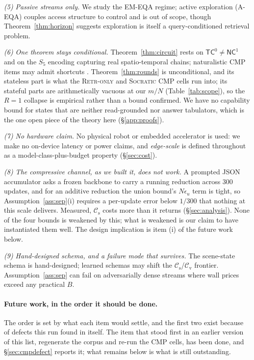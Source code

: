 \documentclass[10pt]{article}
\newcommand{\VN}{300}
\theoremstyle{definition}
\theoremstyle{plain}
\newcommand{\cs}{\mathcal{C}_{\mathrm{s}}}
\newcommand{\cv}{\mathcal{C}_{\mathrm{v}}}
\begin{document}
\emph{(5) Passive streams only.} We study the EM-EQA regime; active exploration (A-EQA) couples access structure to control and is out of scope, though Theorem~\ref{thm:horizon} suggests exploration is itself a query-conditioned retrieval problem.

\emph{(6) One theorem stays conditional.} Theorem~\ref{thm:circuit} rests on $\mathsf{TC}^0\neq\mathsf{NC}^1$ and on the $S_5$ encoding capturing real spatio-temporal chains; naturalistic CMP items may admit shortcuts \citep{shortcuts}. Theorem~\ref{thm:rounds} is unconditional, and its stateless part is what the \textsc{Retr-only} and \textsc{Socratic} CMP cells run into; its stateful parts are arithmetically vacuous at our $m/N$ (Table~\ref{tab:scope}), so the $R{=}1$ collapse is empirical rather than a bound confirmed. We have no capability bound for states that are neither read-grounded nor answer tabulators, which is the one open piece of the theory here (\S\ref{app:proofs}).

\emph{(7) No hardware claim.} No physical robot or embedded accelerator is used: we make no on-device latency or power claims, and \emph{edge-scale} is defined throughout as a model-class-plus-budget property (\S\ref{sec:cost}).

\emph{(8) The compressive channel, as we built it, does not work.} A prompted JSON accumulator
asks a frozen backbone to carry a running reduction across $\VN{}$ updates, and for an additive
reduction the union bound's $N\epsilon_u$ term is tight, so Assumption~\ref{ass:sep}(i) requires
a per-update error below $1/\VN{}$ that nothing at this scale delivers. Measured, $\cs$ costs
more than it returns (\S\ref{sec:analysis}). None of the four bounds is weakened by this; what
is weakened is our claim to have instantiated them well. The design implication is item (i) of
the future work below.

\emph{(9) Hand-designed schema, and a failure mode that survives.} The scene-state schema is hand-designed; learned schemas may shift the $\cs$/$\cv$ frontier. Assumption~\ref{ass:sep} can fail on adversarially dense streams where wall prices exceed any practical $B$.

\paragraph{Future work, in the order it should be done.} The order is set by what each item
would settle, and the first two exist because of defects this run found in itself. The item that
stood first in an earlier version of this list, regenerate the corpus and re-run the CMP
cells, has been done, and \S\ref{sec:cmpdefect} reports it; what remains below is what is
still outstanding.
\end{document}
